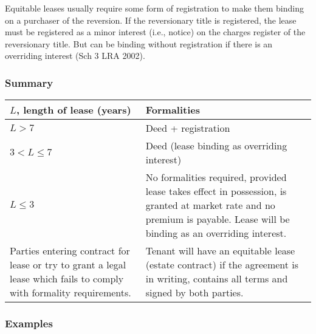 \documentclass[
]{article}
\begin{document}
Equitable leases usually require some form of registration to make them
binding on a purchaser of the reversion. If the reversionary title is
registered, the lease must be registered as a minor interest (i.e.,
notice) on the charges register of the reversionary title. But can be
binding without registration if there is an overriding interest (Sch 3
LRA 2002).

\hypertarget{summary}{%
\subsubsection{Summary}\label{summary}}

\begin{longtable}[]{@{}ll@{}}
\toprule()
{\(L\)}, length of lease (years) & Formalities \\
\midrule()
\endhead
{\(L > 7\)} & Deed + registration \\
{\(3 < L \leq 7\)} & Deed (lease binding as overriding interest) \\
{\(L \leq 3\)} & No formalities required, provided lease takes effect in
possession, is granted at market rate and no premium is payable. Lease
will be binding as an overriding interest. \\
Parties entering contract for lease or try to grant a legal lease which
fails to comply with formality requirements. & Tenant will have an
equitable lease (estate contract) if the agreement is in writing,
contains all terms and signed by both parties. \\
\bottomrule()
\end{longtable}

\hypertarget{examples}{%
\subsubsection{Examples}\label{examples}}
\end{document}
